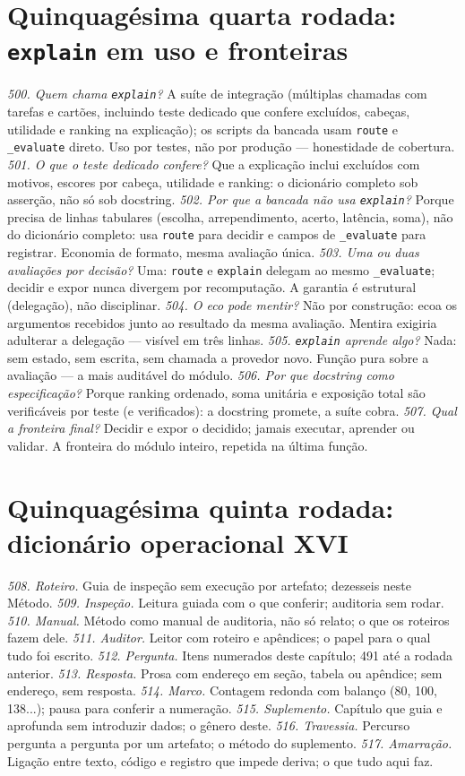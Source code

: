 \section{Quinquagésima quarta rodada: \texttt{explain} em uso e fronteiras}
\textit{500. Quem chama \texttt{explain}?} A suíte de integração (múltiplas chamadas com tarefas e cartões, incluindo teste dedicado que confere excluídos, cabeças, utilidade e ranking na explicação); os scripts da bancada usam \texttt{route} e \texttt{\_evaluate} direto. Uso por testes, não por produção --- honestidade de cobertura.
\textit{501. O que o teste dedicado confere?} Que a explicação inclui excluídos com motivos, escores por cabeça, utilidade e ranking: o dicionário completo sob asserção, não só sob docstring.
\textit{502. Por que a bancada não usa \texttt{explain}?} Porque precisa de linhas tabulares (escolha, arrependimento, acerto, latência, soma), não do dicionário completo: usa \texttt{route} para decidir e campos de \texttt{\_evaluate} para registrar. Economia de formato, mesma avaliação única.
\textit{503. Uma ou duas avaliações por decisão?} Uma: \texttt{route} e \texttt{explain} delegam ao mesmo \texttt{\_evaluate}; decidir e expor nunca divergem por recomputação. A garantia é estrutural (delegação), não disciplinar.
\textit{504. O eco pode mentir?} Não por construção: ecoa os argumentos recebidos junto ao resultado da mesma avaliação. Mentira exigiria adulterar a delegação --- visível em três linhas.
\textit{505. \texttt{explain} aprende algo?} Nada: sem estado, sem escrita, sem chamada a provedor novo. Função pura sobre a avaliação --- a mais auditável do módulo.
\textit{506. Por que docstring como especificação?} Porque ranking ordenado, soma unitária e exposição total são verificáveis por teste (e verificados): a docstring promete, a suíte cobra.
\textit{507. Qual a fronteira final?} Decidir e expor o decidido; jamais executar, aprender ou validar. A fronteira do módulo inteiro, repetida na última função.
\section{Quinquagésima quinta rodada: dicionário operacional XVI}
\textit{508. Roteiro.} Guia de inspeção sem execução por artefato; dezesseis neste Método.
\textit{509. Inspeção.} Leitura guiada com o que conferir; auditoria sem rodar.
\textit{510. Manual.} Método como manual de auditoria, não só relato; o que os roteiros fazem dele.
\textit{511. Auditor.} Leitor com roteiro e apêndices; o papel para o qual tudo foi escrito.
\textit{512. Pergunta.} Itens numerados deste capítulo; 491 até a rodada anterior.
\textit{513. Resposta.} Prosa com endereço em seção, tabela ou apêndice; sem endereço, sem resposta.
\textit{514. Marco.} Contagem redonda com balanço (80, 100, 138...); pausa para conferir a numeração.
\textit{515. Suplemento.} Capítulo que guia e aprofunda sem introduzir dados; o gênero deste.
\textit{516. Travessia.} Percurso pergunta a pergunta por um artefato; o método do suplemento.
\textit{517. Amarração.} Ligação entre texto, código e registro que impede deriva; o que tudo aqui faz.
